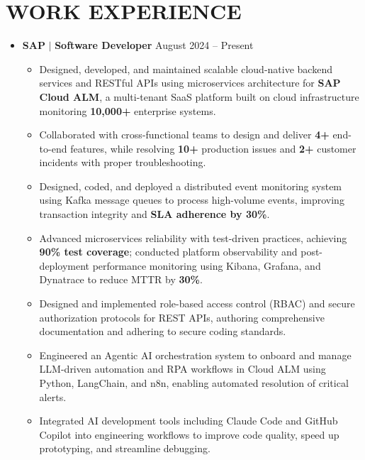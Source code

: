 \documentclass[a4paper,11pt]{article}
\begin{document}
 
\section{WORK EXPERIENCE}
\begin{itemize}[leftmargin=0in, label={}]
  \item
    \textbf{SAP }$|$\textbf{ Software Developer} \hfill \small{August 2024 -- Present} \\
    \begin{itemize}[leftmargin=0.18in, itemsep=0.5pt, topsep=1pt]
      \item \small{Designed, developed, and maintained scalable cloud-native backend services and RESTful APIs using microservices architecture for \textbf{SAP Cloud ALM}, a multi-tenant SaaS platform built on cloud infrastructure monitoring \textbf{10,000+} enterprise systems.}
      \item \small{Collaborated with cross-functional teams to design and deliver \textbf{4+} end-to-end features, while resolving \textbf{10+} production issues and \textbf{2+} customer incidents with proper troubleshooting.}
      \item \small{Designed, coded, and deployed a distributed event monitoring system using Kafka message queues to process high-volume events, improving transaction integrity and \textbf{SLA adherence by 30\%}.}
      \item \small{Advanced microservices reliability with test-driven practices, achieving \textbf{90\% test coverage}; conducted platform observability and post-deployment performance monitoring using Kibana, Grafana, and Dynatrace to reduce MTTR by \textbf{30\%}.}
      \item \small{Designed and implemented role-based access control (RBAC) and secure authorization protocols for REST APIs, authoring comprehensive documentation and adhering to secure coding standards.}
      \item \small{Engineered an Agentic AI orchestration system to onboard and manage LLM-driven automation and RPA workflows in Cloud ALM using Python, LangChain, and n8n, enabling automated resolution of critical alerts.}
      \item \small{Integrated AI development tools including Claude Code and GitHub Copilot into engineering workflows to improve code quality, speed up prototyping, and streamline debugging.}
    \end{itemize}
\end{itemize}
\end{document}
